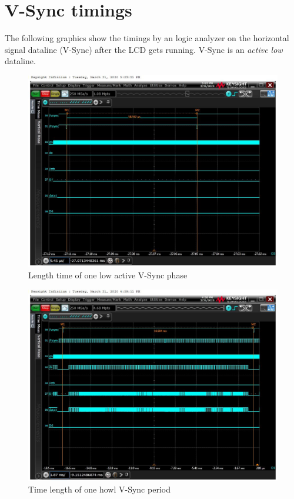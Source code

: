 \section{V-Sync timings}%
The following graphics show the timings by an logic analyzer on the horizontal
signal dataline (V-Sync) after the LCD gets running. V-Sync is an \textit{active
low} dataline.
\label{sub:vsync_timings}
\begin{figure}[!h]
\begin{center}
    \includegraphics[width=14cm]{pictures/lcd_timings/vsync_length.jpg}
\end{center}
\caption{Length time of one low active V-Sync phase}
\label{fig:vsync_active_time}
\end{figure}
\newpage
\begin{figure}[ht]
\begin{center}
    \includegraphics[width=14cm]{pictures/lcd_timings/vsync_periode.jpg}
\end{center}
\caption{Time length of one howl V-Sync period}
\label{fig:one_vsync_period}
\end{figure}

